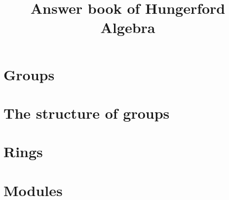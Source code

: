 \documentclass[11pt,oneside]{book}
\title{Answer book of Hungerford Algebra}
\author{}
\date{}
\theoremstyle{definition}
\begin{document}
\newtheorem*{tips}{\emph{TIPS}}
\chapter{Groups}










\chapter{The structure of groups}

\chapter{Rings}







\chapter{Modules}


\end{document}
